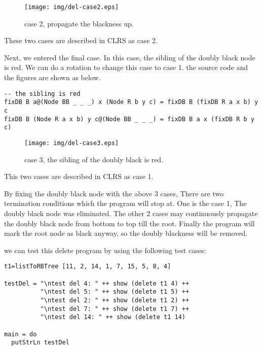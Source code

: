 \documentclass{article}
\begin{document}
\begin{figure}[htbp]
       \begin{center}
	\texttt{[image: img/del-case2.eps]}
        \caption{case 2, propagate the blackness up.} \label{fig:del-case2}
       \end{center}
\end{figure}

These two cases are described in CLRS as case 2.

Next, we entered the final case. In this case, the sibling of the doubly black node is red.
We can do a rotation to change this case to case 1. the source code and the figures are shown
as below.

\begin{lstlisting}
-- the sibling is red
fixDB B a@(Node BB _ _ _) x (Node R b y c) = fixDB B (fixDB R a x b) y c
fixDB B (Node R a x b) y c@(Node BB _ _ _) = fixDB B a x (fixDB R b y c)
\end{lstlisting}

\begin{figure}[htbp]
       \begin{center}
	\texttt{[image: img/del-case3.eps]}
        \caption{case 3, the sibling of the doubly black is red.} \label{fig:del-case3}
       \end{center}
\end{figure}

This two cases are described in CLRS as case 1.

By fixing the doubly black node with the above 3 cases, There are two termination conditions
which the program will stop at. One is the case 1, The doubly black node was eliminated. The
other 2 cases may continuously propagate the doubly black node from bottom to top till the root.
Finally the program will mark the root node as black anyway, so the doubly blackness will be
removed.

we can test this delete program by using the following test cases:

\begin{lstlisting}
t1=listToRBTree [11, 2, 14, 1, 7, 15, 5, 8, 4]

testDel = "\ntest del 4: " ++ show (delete t1 4) ++
          "\ntest del 5: " ++ show (delete t1 5) ++
          "\ntest del 2: " ++ show (delete t1 2) ++
          "\ntest del 7: " ++ show (delete t1 7) ++
          "\ntest del 14: " ++ show (delete t1 14)

main = do
  putStrLn testDel
\end{lstlisting}
\end{document}
